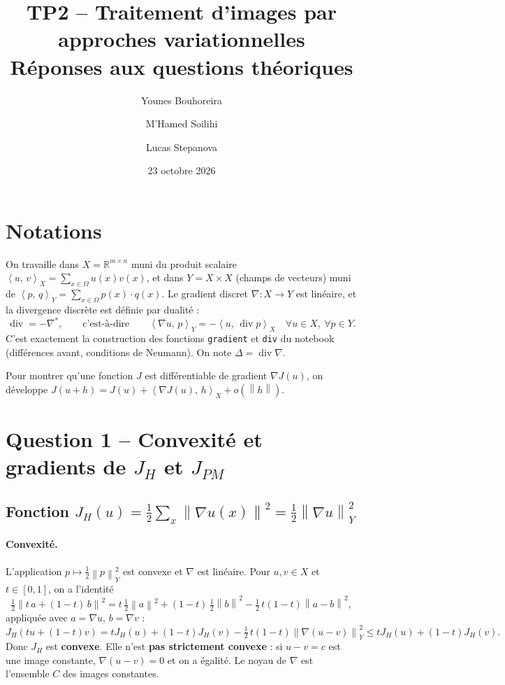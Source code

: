 \documentclass[11pt,a4paper]{article}
\title{TP2 -- Traitement d'images par approches variationnelles\\[2pt]
\large Réponses aux questions théoriques}
\author{Younes Bouhoreira \and M'Hamed Soilihi \and Lucas Stepanova}
\date{23 octobre 2026}
\newcommand{\R}{\mathbb{R}}
\newcommand{\X}{X}
\newcommand{\Y}{Y}
\newcommand{\ps}[2]{\left\langle #1,\, #2 \right\rangle}
\newcommand{\nr}[1]{\left\| #1 \right\|}
\newcommand{\dive}{\operatorname{div}}
\begin{document}
\maketitle

\section*{Notations}

On travaille dans $\X = \R^{m\times n}$ muni du produit scalaire $\ps{u}{v}_\X = \sum_{x\in\Omega} u(x)v(x)$,
et dans $\Y = \X \times \X$ (champs de vecteurs) muni de $\ps{p}{q}_\Y = \sum_{x\in\Omega} p(x)\cdot q(x)$.
Le gradient discret $\nabla : \X \to \Y$ est linéaire, et la divergence discrète est définie par dualité :
\[
  \dive = -\nabla^{*}, \qquad \text{c'est-à-dire} \qquad
  \ps{\nabla u}{p}_\Y = -\ps{u}{\dive p}_\X \quad \forall u\in\X,\ \forall p \in \Y .
\]
C'est exactement la construction des fonctions \texttt{gradient} et \texttt{div} du notebook
(différences avant, conditions de Neumann). On note $\Delta = \dive \nabla$.

Pour montrer qu'une fonction $J$ est différentiable de gradient $\nabla J(u)$, on développe
$J(u+h) = J(u) + \ps{\nabla J(u)}{h}_\X + o(\nr{h})$.

\section*{Question 1 -- Convexité et gradients de $J_H$ et $J_{PM}$}

\subsection*{Fonction $J_H(u) = \frac12 \sum_{x} \nr{\nabla u(x)}^2 = \frac12 \nr{\nabla u}_\Y^2$}

\paragraph{Convexité.}
L'application $p \mapsto \frac12\nr{p}_\Y^2$ est convexe et $\nabla$ est linéaire.
Pour $u,v\in\X$ et $t\in[0,1]$, on a l'identité
\[
  \tfrac12\nr{t\,a + (1-t)\,b}^2 = t\,\tfrac12\nr{a}^2 + (1-t)\,\tfrac12\nr{b}^2 - \tfrac12\,t(1-t)\nr{a-b}^2 ,
\]
appliquée avec $a = \nabla u$, $b=\nabla v$ :
\[
  J_H(tu+(1-t)v) = t J_H(u) + (1-t) J_H(v) - \tfrac12\,t(1-t)\nr{\nabla(u-v)}_\Y^2 \le t J_H(u) + (1-t) J_H(v).
\]
Donc $J_H$ est \textbf{convexe}. Elle n'est \textbf{pas strictement convexe} : si $u - v = c$ est une
image constante, $\nabla(u-v)=0$ et on a égalité. Le noyau de $\nabla$ est l'ensemble $C$ des images constantes.
\end{document}
